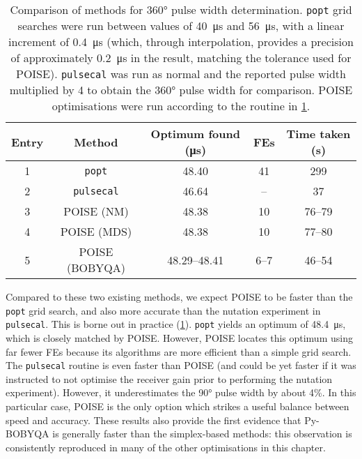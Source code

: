 \begin{table}[!ht]
    \centering
    \begin{tabular}{ccccc}
        \toprule
        Entry & Method & Optimum found (\unit{\us}) & FEs & Time taken (\unit{\s}) \\
        \midrule
        1  & \texttt{popt}      & 48.40        & 41   & 299    \\
        2  & \texttt{pulsecal}  & 46.64        & --   & 37     \\
        3 & POISE (NM)         & 48.38        & 10   & 76--79 \\
        4 & POISE (MDS)        & 48.38        & 10   & 77--80 \\
        5 & POISE (BOBYQA)  & 48.29--48.41 & 6--7 & 46--54 \\
        \bottomrule
    \end{tabular}
    \caption[Comparison of methods for \ang{360} pulse width determination]{
        Comparison of methods for \ang{360} pulse width determination.
        \texttt{popt} grid searches were run between values of \qty{40}{\us} and \qty{56}{\us}, with a linear increment of \qty{0.4}{\us} (which, through interpolation, provides a precision of approximately \qty{0.2}{\us} in the result, matching the tolerance used for POISE).
        \texttt{pulsecal} was run as normal and the reported pulse width multiplied by 4 to obtain the \ang{360} pulse width for comparison.
        POISE optimisations were run according to the routine in \cref{tbl:poisecal_48}.
    }
    \label{tbl:poisecal_48}
\end{table}

Compared to these two existing methods, we expect POISE to be faster than the \texttt{popt} grid search, and also more accurate than the nutation experiment in \texttt{pulsecal}.
This is borne out in practice (\cref{tbl:poisecal_48}).
\texttt{popt} yields an optimum of \qty{48.4}{\us}, which is closely matched by POISE.
However, POISE locates this optimum using far fewer FEs because its algorithms are more efficient than a simple grid search.
The \texttt{pulsecal} routine is even faster than POISE (and could be yet faster if it was instructed to not optimise the receiver gain prior to performing the nutation experiment).
However, it underestimates the \ang{90} pulse width by about 4\%.
In this particular case, POISE is the only option which strikes a useful balance between speed and accuracy.
These results also provide the first evidence that Py-BOBYQA is generally faster than the simplex-based methods: this observation is consistently reproduced in many of the other optimisations in this chapter.


